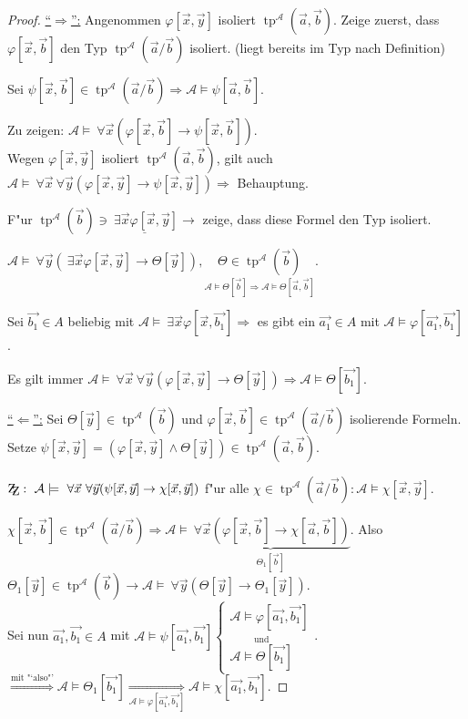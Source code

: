 \documentclass[a4paper,12pt,numbers=noenddot,parskip=full]{scrartcl}
\newcommand{\Forall}{~\forall}
\newcommand{\Exists}{~\exists}
\newcommand{\scrA}{\mathcal{A}}
\newcommand{\zz}{\mathrm{Z\kern-.3em\raise-0.5ex\hbox{Z}}:~}
\DeclareMathOperator{\typ}{tp}
\theoremstyle{dotless}
\begin{document}
\begin{proof}
	\underline{"`$\Rightarrow$"':} Angenommen $\varphi[\vec{x}, \vec{y}]$ isoliert $\typ^\scrA(\vec{a},\vec{b})$. Zeige zuerst, dass $\varphi[\vec{x}, \vec{b}]$ den Typ $\typ^\scrA(\vec{a}/\vec{b})$ isoliert. (liegt bereits im Typ nach Definition)
	
	Sei $\psi[\vec{x}, \vec{b}] \in \typ^\scrA (\vec{a}/\vec{b}) \Rightarrow \scrA \models \psi[\vec{a},\vec{b}]$.
	
	Zu zeigen: $\scrA \models \Forall \vec{x}(\varphi[\vec{x}, \vec{b}] \rightarrow \psi[\vec{x}, \vec{b}])$.\\
	Wegen $\varphi[\vec{x},\vec{y}]$ isoliert $\typ^\scrA(\vec{a},\vec{b})$, gilt auch $\scrA \models \Forall\vec{x} \Forall \vec{y}(\varphi[\vec{x}, \vec{y}]\rightarrow \psi[\vec{x},\vec{y}]) \Rightarrow$ Behauptung.
	
	F"ur $\typ^\scrA(\vec{b}) \ni \underline{\Exists \vec{x} \varphi[\vec{x},\vec{y}]} \rightarrow$ zeige, dass diese Formel den Typ isoliert.
	
	$\scrA \models \Forall \vec{y}(\Exists \vec{x}\varphi[\vec{x}, \vec{y}]\rightarrow \Theta[\vec{y}]), \underset{\scrA \models \Theta[\vec{b}] \Rightarrow \scrA \models \Theta[\vec{a}, \vec{b}]}{\Theta \in \typ^\scrA(\vec{b})}$.
	
	Sei $\vec{b_1} \in A$ beliebig mit $\scrA \models \Exists\vec{x} \varphi[\vec{x}, \vec{b_1}] \Rightarrow$ es gibt ein $\vec{a_1} \in A$ mit $\scrA \models \varphi[\vec{a_1}, \vec{b_1}]$.
	
	Es gilt immer $\scrA \models \Forall \vec{x} \Forall \vec{y} (\varphi[\vec{x}, \vec{y}] \rightarrow \Theta[\vec{y}]) \Longrightarrow \scrA \models \Theta[\vec{b_1}]$.
	
	\underline{"`$\Leftarrow$"':} Sei $\Theta[\vec{y}] \in \typ^\scrA(\vec{b})$ und $\varphi[\vec{x}, \vec{b}] \in \typ^\scrA (\vec{a}/\vec{b})$ isolierende Formeln. Setze $\psi[\vec{x}, \vec{y}] = (\varphi[\vec{x}, \vec{y}] \land \Theta[\vec{y}]) \in \typ^\scrA(\vec{a}, \vec{b})$.
	
	$\zz \scrA \models \Forall \vec{x} \Forall \vec{y} (\psi[\vec{x}, \vec{y}] \rightarrow \chi[\vec{x}, \vec{y}])$ f"ur alle $\chi \in \typ^\scrA(\vec{a}/\vec{b}): \scrA \models \chi[\vec{x}, \vec{y}]$.
	
	$\chi[\vec{x}, \vec{b}] \in \typ^\scrA(\vec{a}/\vec{b}) \Rightarrow \scrA \models \underbrace{\Forall \vec{x}(\varphi[\vec{x}, \vec{b}] \rightarrow \chi[\vec{a}, \vec{b}])}_{\Theta_1[\vec{b}]}$. Also $\Theta_1[\vec{y}] \in \typ^\scrA(\vec{b}) \rightarrow \scrA \models \Forall \vec{y} (\Theta[\vec{y}] \rightarrow \Theta_1[\vec{y}])$.\\
	Sei nun $\vec{a_1}, \vec{b_1} \in A$ mit $\scrA \models \psi[\vec{a_1}, \vec{b_1}] \begin{cases}
		\scrA \models \varphi[\vec{a_1},\vec{b_1}]\\
		\overset{\text{und}}{\scrA \models \Theta[\vec{b_1}]}
	\end{cases}$. $\overset{\text{mit "`also"'}}{\Longrightarrow} \scrA \models \Theta_1[\vec{b_1}] \underset{\scrA \models \varphi[\vec{a_1},\vec{b_1}]}{\Longrightarrow} \scrA \models \chi[\vec{a_1},\vec{b_1}]$. 
\end{proof}
\end{document}
